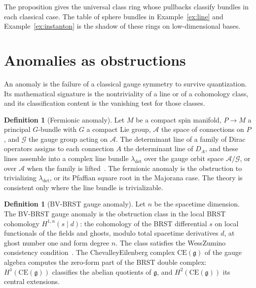 \documentclass[11pt,letterpaper]{article}
\theoremstyle{definition}
\newtheorem{definition}[theorem]{Definition}
\theoremstyle{remark}
\begin{document}
The proposition gives the universal class ring whose pullbacks classify bundles in each classical case. The table of sphere bundles in Example~\ref{ex:line} and Example~\ref{ex:instanton} is the shadow of these rings on low-dimensional bases.

\section{Anomalies as obstructions}
\label{sec:anomalies}

An anomaly is the failure of a classical gauge symmetry to survive quantization. Its mathematical signature is the nontriviality of a line or of a cohomology class, and its classification content is the vanishing test for those classes.

\begin{definition}[Fermionic anomaly]
\label{def:fermionic-anomaly}
Let $M$ be a compact spin manifold, $P \to M$ a principal $G$-bundle with $G$ a compact Lie group, $\mathcal{A}$ the space of connections on $P$, and $\mathcal{G}$ the gauge group acting on $\mathcal{A}$. The determinant line of a family of Dirac operators assigns to each connection $A$ the determinant line of $D_A$, and these lines assemble into a complex line bundle $\lambda_{\mathrm{det}}$ over the gauge orbit space $\mathcal{A}/\mathcal{G}$, or over $\mathcal{A}$ when the family is lifted~\cite{quillen, atiyah-singer}. The fermionic anomaly is the obstruction to trivializing $\lambda_{\mathrm{det}}$, or its Pfaffian square root in the Majorana case. The theory is consistent only where the line bundle is trivializable.
\end{definition}

\begin{definition}[BV-BRST gauge anomaly]
\label{def:bvbrst-anomaly}
Let $n$ be the spacetime dimension. The BV-BRST gauge anomaly is the obstruction class in the local BRST cohomology $H^{1,n}(s\mid d)$: the cohomology of the BRST differential $s$ on local functionals of the fields and ghosts, modulo total spacetime derivatives $d$, at ghost number one and form degree $n$. The class satisfies the Wess\textendash{}Zumino consistency condition~\cite{wess-zumino, bbh}. The Chevalley\textendash{}Eilenberg complex $\mathrm{CE}(\mathfrak{g})$ of the gauge algebra computes the zero-form part of the BRST double complex: $H^1(\mathrm{CE}(\mathfrak{g}))$ classifies the abelian quotients of $\mathfrak{g}$, and $H^2(\mathrm{CE}(\mathfrak{g}))$ its central extensions.
\end{definition}
\end{document}
